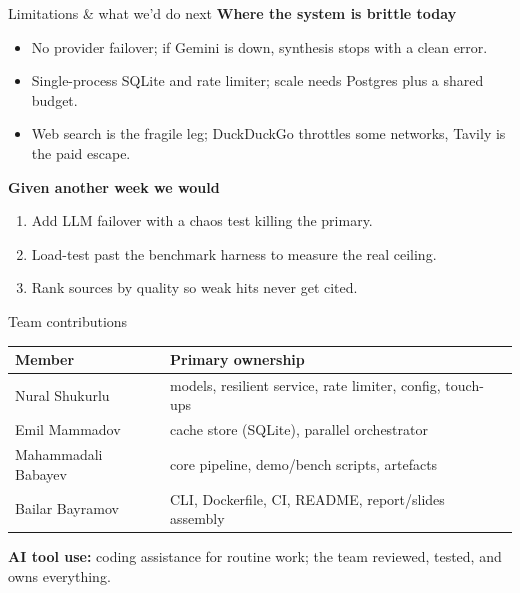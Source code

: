 \documentclass[aspectratio=169,11pt]{beamer}
\begin{document}
\begin{frame}{Limitations \& what we'd do next}
  \textbf{Where the system is brittle today}
  \begin{itemize}\setlength\itemsep{0.3em}
    \item No provider failover; if Gemini is down, synthesis stops with a clean error.
    \item Single-process SQLite and rate limiter; scale needs Postgres plus a shared budget.
    \item Web search is the fragile leg; DuckDuckGo throttles some networks, Tavily is the paid escape.
  \end{itemize}

  \vspace{0.4em}
  \textbf{Given another week we would}
  \begin{enumerate}\setlength\itemsep{0.3em}
    \item Add LLM failover with a chaos test killing the primary.
    \item Load-test past the benchmark harness to measure the real ceiling.
    \item Rank sources by quality so weak hits never get cited.
  \end{enumerate}
\end{frame}

\begin{frame}{Team contributions}
  \begin{center}\footnotesize
  \begin{tabularx}{\linewidth}{lXl}
    \toprule
    \textbf{Member} & \textbf{Primary ownership} \\
    \midrule
    Nural Shukurlu   & models, resilient service, rate limiter, config, touch-ups   \\
    Emil Mammadov    & cache store (SQLite), parallel orchestrator                  \\
    Mahammadali Babayev & core pipeline, demo/bench scripts, artefacts           \\
    Bailar Bayramov  & CLI, Dockerfile, CI, README, report/slides assembly          \\
    \bottomrule
  \end{tabularx}
  \end{center}

  \vspace{0.4em}
  \textbf{AI tool use:} coding assistance for routine work; the team reviewed, tested, and owns everything.
\end{frame}
\end{document}
